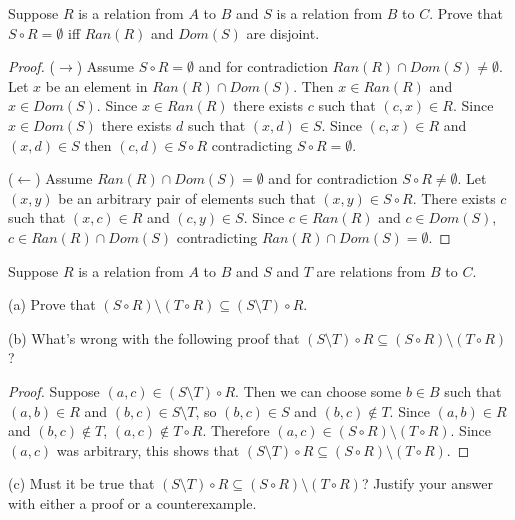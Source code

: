 \begin{tcolorbox}[title=Problem 11, breakable]
    Suppose $R$ is a relation from $A$ to $B$ and $S$ is a relation from $B$ to $C$.
    Prove that $S \circ R = \emptyset$ iff $Ran(R)$ and $Dom(S)$ are disjoint.
\end{tcolorbox}

\begin{proof}
    ($\rightarrow$) Assume $S \circ R = \emptyset$ and for contradiction $Ran(R) \cap Dom(S) \not= \emptyset$.
    Let $x$ be an element in $Ran(R) \cap Dom(S)$.
    Then $x \in Ran(R)$ and $x \in Dom(S)$.
    Since $x \in Ran(R)$ there exists $c$ such that $(c, x) \in R$.
    Since $x \in Dom(S)$ there exists $d$ such that $(x, d) \in S$.
    Since $(c, x) \in R$ and $(x, d) \in S$ then $(c, d) \in S \circ R$ 
        contradicting $S \circ R = \emptyset$.

    ($\leftarrow$) Assume $Ran(R) \cap Dom(S) = \emptyset$ and for contradiction $S \circ R \not= \emptyset$.
    Let $(x, y)$ be an arbitrary pair of elements such that $(x, y) \in S \circ R$.
    There exists $c$ such that $(x, c) \in R$ and $(c, y) \in S$.
    Since $c \in Ran(R)$ and $c \in Dom(S)$, $c \in Ran(R) \cap Dom(S)$ contradicting $Ran(R) \cap Dom(S) = \emptyset$.
\end{proof}

\begin{tcolorbox}[title=Problem 12, breakable]
    Suppose $R$ is a relation from $A$ to $B$ and $S$ and $T$ are relations from $B$ to $C$.

    (a) Prove that $(S \circ R) \setminus (T \circ R) \subseteq (S \setminus T) \circ R$.

    (b) What's wrong with the following proof that $(S \setminus T) \circ R \subseteq (S \circ R) \setminus (T \circ R)$?

    \begin{proof}
        Suppose $(a, c) \in (S \setminus T) \circ R$. Then we can choose some $b \in B$ such that 
        $(a, b) \in R$ and $(b, c) \in S \setminus T$, so $(b, c) \in S$ and $(b, c) \notin T$.
        Since $(a, b) \in R$ and $(b, c) \notin T$, $(a, c) \notin T \circ R$. Therefore
        $(a, c) \in (S \circ R) \setminus (T \circ R)$. Since $(a, c)$ was arbitrary, this shows that 
        $(S \setminus T) \circ R \subseteq (S \circ R) \setminus (T \circ R)$.
    \end{proof}

    (c) Must it be true that $(S \setminus T) \circ R \subseteq (S \circ R) \setminus (T \circ R)$?
    Justify your answer with either a proof or a counterexample.
\end{tcolorbox}

